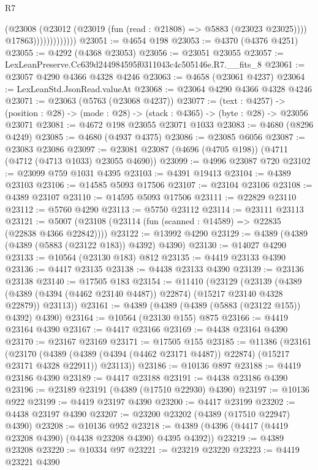 \begin{lexlean}{R7}
\begin{coremodule}
                            (@23008
                              (@23012 (@23019 (fun (read : @21808) => @5883 (@23023 @23025))))
                              @17863)))))))))))))
@23051 := @4654 @198
@23053 := @4370 (@4376 @4251)
@23055 := @4292 (@4368 @23053)
@23056 := @23051 @23055
@23057 := LexLeanPreserve.Cc639d244984595f0311043c4c505146e.R7.__fits_8
@23061 := @23057 @4290 @4366 @4328 @4246
@23063 := @4658 (@23061 @4237)
@23064 := LexLeanStd.JsonRead.valueAt
@23068 := @23064 @4290 @4366 @4328 @4246
@23071 := @23063 (@5763 (@23068 @4237))
@23077 := (text : @4257) ->
  (position : @28) -> (mode : @28) -> (stack : @4365) -> (byte : @28) -> @23056 @23071
@23081 := @4672 @198 @23055 @23071 @1033
@23083 := @4680 (@8296 @4249)
@23085 := @4680 (@4937 @4375)
@23086 := @23085 @6056
@23087 := @23083 @23086
@23097 := @23081 @23087 (@4696 (@4705 @198)) (@4711 (@4712 (@4713 @1033) @23055 @4690))
@23099 := @4996 @23087 @720
@23102 := @23099 @759 @1031 @4395
@23103 := @4391 @19413
@23104 := @4389 @23103
@23106 := @14585 @5093 @17506
@23107 := @23104 @23106
@23108 := @4389 @23107
@23110 := @14595 @5093 @17506
@23111 := @22829 @23110
@23112 := @5760 @4290
@23113 := @5750 @23112
@23114 := @23111 @23113
@23121 := @5007 (@23108 (@23114 (fun (scanned : @14589) => @22835 (@22838 @4366 @22842))))
@23122 := @13992 @4290
@23129 := @4389 (@4389 (@4389 (@5883 (@23122 @183)) @4392) @4390)
@23130 := @14027 @4290
@23133 := @10564 (@23130 @183) @812
@23135 := @4419 @23133 @4390
@23136 := @4417 @23135
@23138 := @4438 @23133 @4390
@23139 := @23136 @23138
@23140 := @17505 @183
@23154 := @11410
    (@23129
      (@23139
        (@4389 (@4389 (@4394 (@4462 @23140 @4487)) @22874) (@15217 @23140 @4328 @22879))
        @23113))
@23161 := @4389 (@4389 (@4389 (@5883 (@23122 @155)) @4392) @4390)
@23164 := @10564 (@23130 @155) @875
@23166 := @4419 @23164 @4390
@23167 := @4417 @23166
@23169 := @4438 @23164 @4390
@23170 := @23167 @23169
@23171 := @17505 @155
@23185 := @11386
    (@23161
      (@23170
        (@4389 (@4389 (@4394 (@4462 @23171 @4487)) @22874) (@15217 @23171 @4328 @22911))
        @23113))
@23186 := @10136 @897
@23188 := @4419 @23186 @4390
@23189 := @4417 @23188
@23191 := @4438 @23186 @4390
@23196 := @23189 @23191 (@4389 (@17510 @22930) @4390)
@23197 := @10136 @922
@23199 := @4419 @23197 @4390
@23200 := @4417 @23199
@23202 := @4438 @23197 @4390
@23207 := @23200 @23202 (@4389 (@17510 @22947) @4390)
@23208 := @10136 @952
@23218 := @4389 (@4396 (@4417 (@4419 @23208 @4390) (@4438 @23208 @4390) @4395 @4392))
@23219 := @4389 @23208
@23220 := @10334 @97
@23221 := @23219 @23220
@23223 := @4419 @23221 @4390

\end{coremodule}
\end{lexlean}
